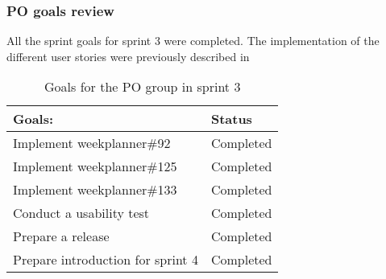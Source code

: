 \subsubsection{PO goals review}
All the sprint goals for sprint 3 were completed.
The implementation of the different user stories were previously described in 
\begin{table}[H]
    \centering
    \begin{tabular}{|l|l|}
    \hline
    Goals:                            & Status        \\ \hline
    Implement weekplanner\#92         & Completed      \\ \hline
    Implement weekplanner\#125        & Completed      \\ \hline
    Implement weekplanner\#133        & Completed      \\ \hline
    Conduct a usability test          & Completed       \\ \hline
    Prepare a release                 & Completed         \\ \hline
    Prepare introduction for sprint 4 & Completed                        \\ \hline
    \end{tabular}
    \caption{Goals for the PO group in sprint 3}
    \label{PO-goal-sprint-3}
\end{table}
